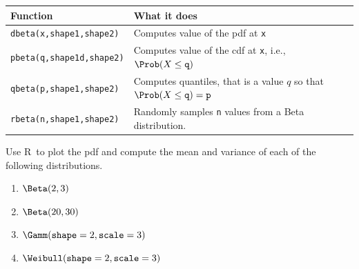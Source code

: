 \documentclass[twoside]{book}\usepackage[]{graphicx}\usepackage[]{xcolor}
\newenvironment{knitrout}{}{} %
\def\R{{\sf R}}
\begin{document}
\begin{knitrout}
{}



\end{knitrout}

\begin{center}
\begin{tabular}{ll}
	\hline
	Function & What it does \\
	\hline
	\texttt{dbeta(x,shape1,shape2)} & Computes value of the pdf at \texttt{x}
	\\
	\texttt{pbeta(q,shape1d,shape2)} 
		& Computes value of the cdf at \texttt{x}, i.e., 
	$\Prob(X \le \texttt{q})$
	\\
	\texttt{qbeta(p,shape1,shape2)} 
		& Computes quantiles, that is a value $q$ so that 
	$\Prob(X \le \texttt{q}) = \texttt{p}$
    \\
	\texttt{rbeta(n,shape1,shape2)} & Randomly samples \texttt{n} values from a
	Beta distribution.
	\\
	\hline
\end{tabular}
\end{center}

\begin{problem}
	Use \R\ to plot the pdf and 
	compute the mean and variance of each of the following distributions.
	\begin{enumerate}
		\item
			$\Beta(2,3)$
		\item
			$\Beta(20,30)$
		\item
			$\Gamm(\texttt{shape} = 2,\texttt{scale} = 3)$
		\item
			$\Weibull(\texttt{shape} = 2,\texttt{scale} = 3)$
	\end{enumerate}
\end{problem}
\end{document}
